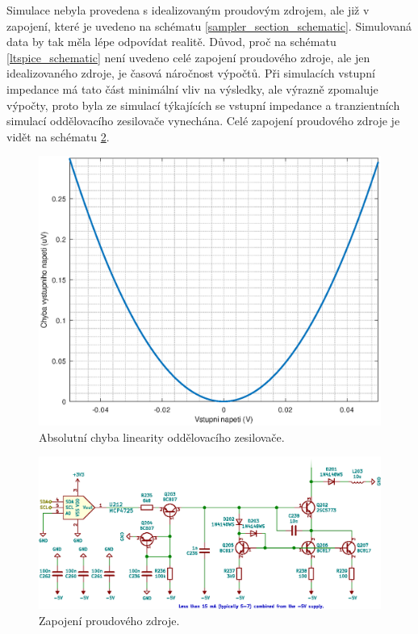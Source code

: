 Simulace nebyla provedena s idealizovaným proudovým zdrojem, ale již v zapojení, které je uvedeno na schématu \ref{sampler_section_schematic}. Simulovaná data by tak měla lépe odpovídat realitě. Důvod, proč na schématu \ref{ltspice_schematic} není uvedeno celé zapojení proudového zdroje, ale jen idealizovaného zdroje, je časová náročnost výpočtů. Při simulacích vstupní impedance má tato část minimální vliv na výsledky, ale výrazně zpomaluje výpočty, proto byla ze simulací týkajících se vstupní impedance a tranzientních simulací oddělovacího zesilovače vynechána. Celé zapojení proudového zdroje je vidět na schématu \ref{current_source_section_schematic}.

\begin{figure}[htbp]
\includegraphics[width=\textwidth,keepaspectratio]{images/transfer_characteristic.eps}\caption{Absolutní chyba linearity oddělovacího zesilovače.}\label{buffer_voltage_error}
\end{figure}

\begin{figure}[htbp]
\includegraphics[width=\textwidth,keepaspectratio]{images/current_source_section.eps}\caption{Zapojení proudového zdroje.}\label{current_source_section_schematic}
\end{figure}

